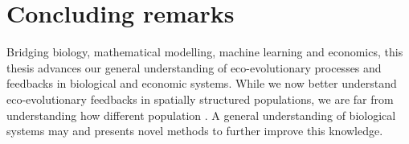 % 
% 
% 
% 
% 

% 
% 

% 
% 


% 



\section{Concluding remarks}


Bridging biology, mathematical modelling, machine learning and economics, this thesis advances our general understanding of eco-evolutionary processes and feedbacks in biological and economic systems.
% 
While we now better understand eco-evolutionary feedbacks in spatially structured populations, we are far from understanding how different population .
% 
A general understanding of biological systems may 
% 
and presents novel methods to further improve this knowledge.


